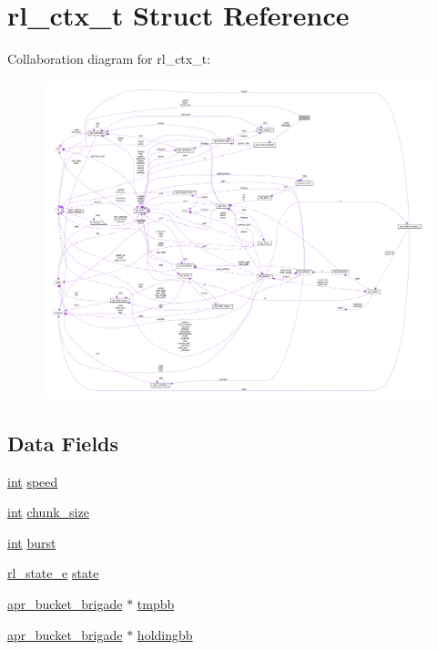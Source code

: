 \hypertarget{structrl__ctx__t}{}\section{rl\+\_\+ctx\+\_\+t Struct Reference}
\label{structrl__ctx__t}


Collaboration diagram for rl\+\_\+ctx\+\_\+t\+:
\nopagebreak
\begin{figure}[H]
\begin{center}
\leavevmode
\includegraphics[width=350pt]{structrl__ctx__t__coll__graph}
\end{center}
\end{figure}
\subsection*{Data Fields}
\begin{DoxyCompactItemize}
\item 
\hyperlink{pcre_8txt_a42dfa4ff673c82d8efe7144098fbc198}{int} \hyperlink{structrl__ctx__t_aa6d120183f50f237f76d34268f22638c}{speed}
\item 
\hyperlink{pcre_8txt_a42dfa4ff673c82d8efe7144098fbc198}{int} \hyperlink{structrl__ctx__t_a3667ad75a20ffaf99938ce41aea196ec}{chunk\+\_\+size}
\item 
\hyperlink{pcre_8txt_a42dfa4ff673c82d8efe7144098fbc198}{int} \hyperlink{structrl__ctx__t_ac40505bccf903c96cc64b9f5a1af9da3}{burst}
\item 
\hyperlink{mod__ratelimit_8c_ab6f963f1244c741eeaea89b02d5b83ad}{rl\+\_\+state\+\_\+e} \hyperlink{structrl__ctx__t_a4fe7fbd72c176f0ade1f126789bb8186}{state}
\item 
\hyperlink{structapr__bucket__brigade}{apr\+\_\+bucket\+\_\+brigade} $\ast$ \hyperlink{structrl__ctx__t_adc299b40a5bb6e52403f946e277b1387}{tmpbb}
\item 
\hyperlink{structapr__bucket__brigade}{apr\+\_\+bucket\+\_\+brigade} $\ast$ \hyperlink{structrl__ctx__t_a6368679f32c0293edc7a0b840da93ba4}{holdingbb}
\end{DoxyCompactItemize}


